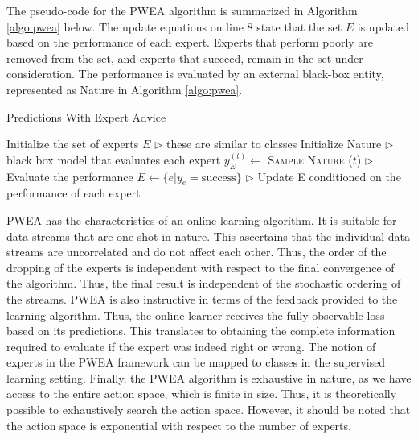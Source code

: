 \documentclass[11pt]{article}
\begin{document}
The pseudo-code for the PWEA algorithm is summarized in Algorithm \ref{algo:pwea} below. The update equations on line 8 state that the set $E$ is updated based on the performance of each expert. Experts that perform poorly are removed from the set, and experts that succeed, remain in the set under consideration. The performance is evaluated by an external black-box entity, represented as Nature in Algorithm \ref{algo:pwea}. 

\begin{algorithm}[H]
\caption{Predictions With Expert Advice}
\label{algo:pwea}
\begin{algorithmic}[1]
\STATE Initialize the set of experts $E$ \hfill $\triangleright$ these are similar to classes
\STATE Initialize Nature \hfill $\triangleright$ black box model that evaluates each expert
    \STATE $y_{E}^{(t)}\leftarrow$ \textsc{Sample Nature} ($t$) \hfill $\triangleright$ Evaluate the performance
    \STATE $E\leftarrow \{e | y_{e} = \text{success}\} $ \hfill $\triangleright$ Update E conditioned on the performance of each expert
\ENDFOR

\end{algorithmic}
\end{algorithm}

PWEA has the characteristics of an online learning algorithm. It is suitable for data streams that are one-shot in nature. This ascertains that the individual data streams are uncorrelated and do not affect each other. Thus, the order of the dropping of the experts is independent with respect to the final convergence of the algorithm. Thus, the final result is independent of the stochastic ordering of the streams. PWEA is also instructive in terms of the feedback provided to the learning algorithm. Thus, the online learner receives the fully observable loss based on its predictions. This translates to obtaining the complete information required to evaluate if the expert was indeed right or wrong. The notion of experts in the PWEA framework can be mapped to classes in the supervised learning setting. Finally, the PWEA algorithm is exhaustive in nature, as we have access to the entire action space, which is finite in size. Thus, it is theoretically possible to exhaustively search the action space. However, it should be noted that the action space is exponential with respect to the number of experts.
\end{document}

